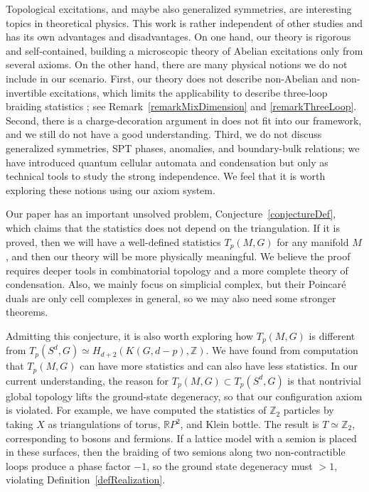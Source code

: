 \documentclass[reprint, amsmath, amssymb, showpacs, floatfix, longbibliography, aps, twocolumn, superscriptaddress, nofootinbib]{revtex4-2}
\newcommand{\ZZ}{{\mathbb Z}}
\newcommand{\RR}{{\mathbb R}}
\theoremstyle{definition}
\begin{document}
Topological excitations, and maybe also generalized symmetries, are interesting topics in theoretical physics. This work is rather independent of other studies and has its own advantages and disadvantages. On one hand, our theory is rigorous and self-contained, building a microscopic theory of Abelian excitations only from several axioms. On the other hand, there are many physical notions we do not include in our scenario. First, our theory does not describe non-Abelian and non-invertible excitations, which limits the applicability to describe three-loop braiding statistics \cite{Wang2014Braiding}; see Remark~\ref{remarkMixDimension} and \ref{remarkThreeLoop}. Second, there is a charge-decoration argument in \cite{FHH21} does not fit into our framework, and we still do not have a good understanding. 
Third, we do not discuss generalized symmetries, SPT phases, anomalies, and boundary-bulk relations; we have introduced quantum cellular automata and condensation but only as technical tools to study the strong independence. We feel that it is worth exploring these notions using our axiom system.

Our paper has an important unsolved problem, Conjecture~\ref{conjectureDef}, which claims that the statistics does not depend on the triangulation. If it is proved, then we will have a well-defined statistics \(T_p(M, G)\) for any manifold $M$, and then our theory will be more physically meaningful.
We believe the proof requires deeper tools in combinatorial topology and a more complete theory of condensation. Also, we mainly focus on simplicial complex, but their Poincar\'e duals are only cell complexes in general, so we may also need some stronger theorems.

Admitting this conjecture, it is also worth exploring how $T_p(M,G)$ is different from $T_p(S^d,G)\simeq H_{d+2}(K(G,d-p),\ZZ)$. We have found from computation that $T_p(M,G)$ can have more statistics and can also have less statistics. In our current understanding, the reason for $T_p(M,G)\subset T_p(S^d,G)$ is that nontrivial global topology lifts the ground-state degeneracy, so that our configuration axiom is violated. For example, we have computed the statistics of $\ZZ_2$ particles by taking $X$ as triangulations of torus, $\RR P^2$, and Klein bottle. The result is $T\simeq \ZZ_2$, corresponding to bosons and fermions. If a lattice model with a semion is placed in these surfaces, then the braiding of two semions along two non-contractible loops produce a phase factor $-1$, so the ground state degeneracy must $>1$, violating Definition~\ref{defRealization}.
\end{document}
